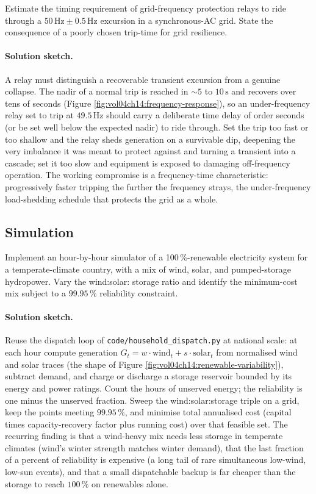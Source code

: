 \begin{exercise}
Estimate the timing requirement of grid-frequency protection relays
to ride through a $50\,\si{\hertz}\pm 0.5\,\si{\hertz}$ excursion in
a synchronous-AC grid. State the consequence of a poorly chosen
trip-time for grid resilience.
\paragraph{Solution sketch.}
A relay must distinguish a recoverable transient excursion from a
genuine collapse. The nadir of a normal trip is reached in $\sim 5$ to
$10\,\si{\second}$ and recovers over tens of seconds (Figure
\ref{fig:vol04ch14:frequency-response}), so an under-frequency relay set
to trip at $49.5\,\si{\hertz}$ should carry a deliberate time delay of
order seconds (or be set well below the expected nadir) to ride through.
Set the trip too fast or too shallow and the relay sheds generation on a
survivable dip, deepening the very imbalance it was meant to protect
against and turning a transient into a cascade; set it too slow and
equipment is exposed to damaging off-frequency operation. The working
compromise is a frequency-time characteristic: progressively faster
tripping the further the frequency strays, the under-frequency
load-shedding schedule that protects the grid as a whole.
\end{exercise}

\subsection*{Simulation}

\begin{exercise}
Implement an hour-by-hour simulator of a 100$\,\%$-renewable
electricity system for a temperate-climate country, with a mix of
wind, solar, and pumped-storage hydropower. Vary the wind:solar:
storage ratio and identify the minimum-cost mix subject to a
$99.95\,\%$ reliability constraint.
\paragraph{Solution sketch.}
Reuse the dispatch loop of \texttt{code/household\_dispatch.py} at
national scale: at each hour compute generation $G_t = w\cdot
\text{wind}_t + s\cdot\text{solar}_t$ from normalised wind and solar
traces (the shape of Figure \ref{fig:vol04ch14:renewable-variability}),
subtract demand, and charge or discharge a storage reservoir bounded by
its energy and power ratings. Count the hours of unserved energy; the
reliability is one minus the unserved fraction. Sweep the
wind:solar:storage triple on a grid, keep the points meeting $99.95\,\%$,
and minimise total annualised cost (capital times capacity-recovery
factor plus running cost) over that feasible set. The recurring finding
is that a wind-heavy mix needs less storage in temperate climates
(wind's winter strength matches winter demand), that the last fraction
of a percent of reliability is expensive (a long tail of rare
simultaneous low-wind, low-sun events), and that a small dispatchable
backup is far cheaper than the storage to reach $100\,\%$ on renewables
alone.
\end{exercise}

